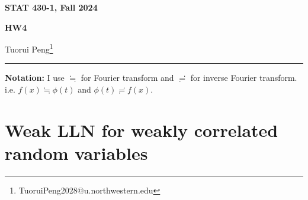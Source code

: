 \documentclass[11pt,a4paper]{article}
\numberwithin{equation}{section}%
\begin{document}
\begin{center}\thispagestyle{plain}

{\LARGE\textbf{STAT 430-1, Fall 2024}}

{\Large\textbf{HW4}}

Tuorui Peng\footnote{TuoruiPeng2028@u.northwestern.edu}
\end{center}

\thispagestyle{myheadings}
\pagestyle{myheadings}

\setcounter{tocdepth}{1}
\tableofcontents

  





\vspace{12pt}


\hrule
\vspace{12pt}

\textbf{Notation:} I use $ \fallingdotseq $ for Fourier transform and $ \risingdotseq $ for inverse Fourier transform. i.e. $ f(x)\fallingdotseq \phi (t) $ and $ \phi (t)\risingdotseq f(x) $.



\section{Weak LLN for weakly correlated random variables}
\end{document}
